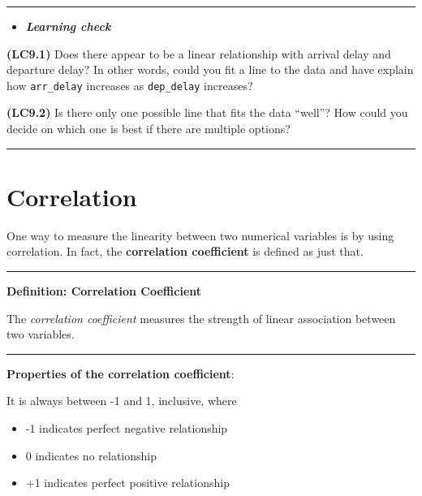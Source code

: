 \documentclass[]{tufte-book}
\let\oldrule=\rule
\renewcommand{\rule}[1]{\oldrule{\linewidth}}
\providecommand{\tightlist}{%
  \setlength{\itemsep}{0pt}\setlength{\parskip}{0pt}}
\newenvironment{rmdblock}[1]
  {\begin{shaded*}
  \begin{itemize}
  \renewcommand{\labelitemi}{
    \raisebox{-.7\height}[0pt][0pt]{
    }
  }
  \item
  }
  {
  \end{itemize}
  \end{shaded*}
  }
\newenvironment{learncheck}
  {\begin{rmdblock}{warning}}
  {\end{rmdblock}}
\begin{document}
\begin{center}\rule{0.5\linewidth}{\linethickness}\end{center}

\begin{learncheck}
\textbf{\emph{Learning check}}
\end{learncheck}

\textbf{(LC9.1)} Does there appear to be a linear relationship with
arrival delay and departure delay? In other words, could you fit a line
to the data and have explain how \texttt{arr\_delay} increases as
\texttt{dep\_delay} increases?

\textbf{(LC9.2)} Is there only one possible line that fits the data
``well''? How could you decide on which one is best if there are
multiple options?

\begin{center}\rule{0.5\linewidth}{\linethickness}\end{center}

\section{Correlation}\label{correlation}

One way to measure the linearity between two numerical variables is by
using correlation. In fact, the \textbf{correlation coefficient} is
defined as just that.

\begin{center}\rule{0.5\linewidth}{\linethickness}\end{center}

\textbf{Definition: Correlation Coefficient}

The \emph{correlation coefficient} measures the strength of linear
association between two variables.

\begin{center}\rule{0.5\linewidth}{\linethickness}\end{center}

\textbf{Properties of the correlation coefficient}:

It is always between -1 and 1, inclusive, where

\begin{itemize}
\tightlist
\item
  -1 indicates perfect negative relationship
\item
  0 indicates no relationship
\item
  +1 indicates perfect positive relationship
\end{itemize}
\end{document}
